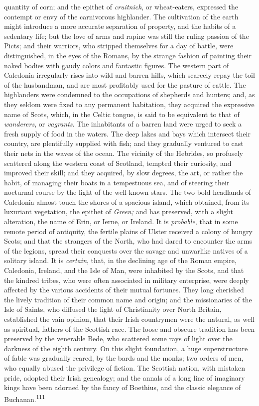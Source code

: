 quantity of corn; and the epithet of \textit{cruitnich}, or
wheat-eaters, expressed the contempt or envy of the carnivorous
highlander. The cultivation of the earth might introduce a more
accurate separation of property, and the habits of a sedentary
life; but the love of arms and rapine was still the ruling
passion of the Picts; and their warriors, who stripped themselves
for a day of battle, were distinguished, in the eyes of the
Romans, by the strange fashion of painting their naked bodies
with gaudy colors and fantastic figures. The western part of
Caledonia irregularly rises into wild and barren hills, which
scarcely repay the toil of the husbandman, and are most
profitably used for the pasture of cattle. The highlanders were
condemned to the occupations of shepherds and hunters; and, as
they seldom were fixed to any permanent habitation, they acquired
the expressive name of Scots, which, in the Celtic tongue, is
said to be equivalent to that of \textit{wanderers}, or \textit{vagrants}. The
inhabitants of a barren land were urged to seek a fresh supply of
food in the waters. The deep lakes and bays which intersect their
country, are plentifully supplied with fish; and they gradually
ventured to cast their nets in the waves of the ocean. The
vicinity of the Hebrides, so profusely scattered along the
western coast of Scotland, tempted their curiosity, and improved
their skill; and they acquired, by slow degrees, the art, or
rather the habit, of managing their boats in a tempestuous sea,
and of steering their nocturnal course by the light of the
well-known stars. The two bold headlands of Caledonia almost
touch the shores of a spacious island, which obtained, from its
luxuriant vegetation, the epithet of \textit{Green;} and has preserved,
with a slight alteration, the name of Erin, or Ierne, or Ireland.
It is \textit{probable}, that in some remote period of antiquity, the
fertile plains of Ulster received a colony of hungry Scots; and
that the strangers of the North, who had dared to encounter the
arms of the legions, spread their conquests over the savage and
unwarlike natives of a solitary island. It is \textit{certain}, that, in
the declining age of the Roman empire, Caledonia, Ireland, and
the Isle of Man, were inhabited by the Scots, and that the
kindred tribes, who were often associated in military enterprise,
were deeply affected by the various accidents of their mutual
fortunes. They long cherished the lively tradition of their
common name and origin; and the missionaries of the Isle of
Saints, who diffused the light of Christianity over North
Britain, established the vain opinion, that their Irish
countrymen were the natural, as well as spiritual, fathers of the
Scottish race. The loose and obscure tradition has been preserved
by the venerable Bede, who scattered some rays of light over the
darkness of the eighth century. On this slight foundation, a huge
superstructure of fable was gradually reared, by the bards and
the monks; two orders of men, who equally abused the privilege of
fiction. The Scottish nation, with mistaken pride, adopted their
Irish genealogy; and the annals of a long line of imaginary kings
have been adorned by the fancy of Boethius, and the classic
elegance of Buchanan.\textsuperscript{111}

